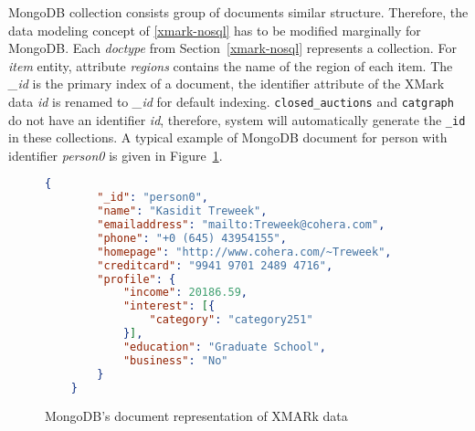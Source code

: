 MongoDB collection consists group of documents similar structure. Therefore, the data modeling concept of \ref{xmark-nosql} has to be modified marginally for MongoDB. Each \textit{doctype} from Section~\ref{xmark-nosql} represents a collection. For \textit{item} entity,  attribute \textit{regions} contains the name of the region of each item. The \textit{\_id} is the primary index of a document, the identifier attribute of the XMark data \textit{id} is renamed to \textit{\_id} for default indexing.  \texttt{closed\_auctions} and \texttt{catgraph} do not have an identifier \textit{id}, therefore, system will automatically generate the \texttt{\_id} in these collections. A typical example of MongoDB document for person with identifier \textit{person0} is given in Figure~\ref{code:mongodb-person0}.	
\begin{figure}
\begin{lstlisting}[language=JSON, basicstyle =\scriptsize]
	{
		"_id": "person0",
		"name": "Kasidit Treweek",
		"emailaddress": "mailto:Treweek@cohera.com",
		"phone": "+0 (645) 43954155",
		"homepage": "http://www.cohera.com/~Treweek",
		"creditcard": "9941 9701 2489 4716",
		"profile": {
			"income": 20186.59,
			"interest": [{
				"category": "category251"
			}],
			"education": "Graduate School",
			"business": "No"
		}
	}
\end{lstlisting}
\caption{MongoDB's document representation of XMARk data}
\label{code:mongodb-person0}
\end{figure}
